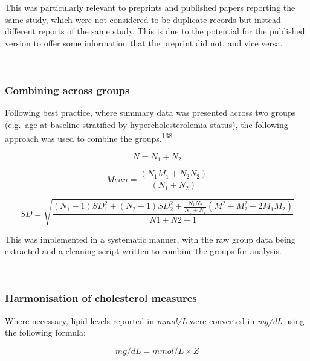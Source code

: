 \documentclass[a4paper, twoside]{templates/ociamthesis}
\begin{document}
This was particularly relevant to preprints and published papers reporting the same study, which were not considered to be duplicate records but instead different reports of the same study. This is due to the potential for the published version to offer some information that the preprint did not, and vice versa.

~

\hypertarget{combining-across-groups}{%
\subsubsection{Combining across groups}\label{combining-across-groups}}

Following best practice, where summary data was presented across two groups (e.g.~age at baseline stratified by hypercholesterolemia status), the following approach was used to combine the groups.\textsuperscript{\protect\hyperlink{ref-higgins2019}{138}}

\begin{equation}
N = N_1 + N_2
  \label{eq:combiningGroups1}
\end{equation}

\begin{equation}
Mean = \frac{(N_1M_1 + N_2N_2)}{(N_1 + N_2)}
  \label{eq:combiningGroups2}
\end{equation}

\begin{equation}
SD = \sqrt{\frac{(N_1-1)SD_1^2 + (N_2-1)SD_2^2 + \frac{N_1N_2}{N_1 + N_2}(M_1^2 + M_2^2 - 2M_1M_2)}{N1 + N2 -1}}
  \label{eq:combiningGroups3}
\end{equation}

This was implemented in a systematic manner, with the raw group data being extracted and a cleaning script written to combine the groups for analysis.

~

\hypertarget{harmonisation-of-cholesterol-measures}{%
\subsubsection{Harmonisation of cholesterol measures}\label{harmonisation-of-cholesterol-measures}}

Where necessary, lipid levels reported in \emph{mmol/L} were converted in \emph{mg/dL} using the following formula:

\begin{equation} 
  mg/dL = mmol/L \times{} Z
  \label{eq:lipidConversion}
\end{equation}
\end{document}
